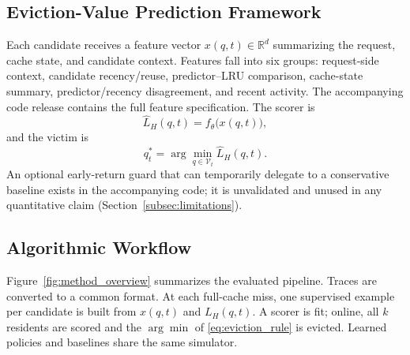 \documentclass[preprint,12pt]{elsarticle}
\begin{document}
\subsection{Eviction-Value Prediction Framework}
\label{subsec:eviction_value_framework}

Each candidate receives a feature vector $x(q,t)\in\mathbb{R}^{d}$ summarizing the request, cache state, and candidate context. Features fall into six groups: request-side context, candidate recency/reuse, predictor--LRU comparison, cache-state summary, predictor/recency disagreement, and recent activity. The accompanying code release contains the full feature specification. The scorer is
\begin{equation}
\widehat{L}_H(q,t)=f_{\theta}\!\bigl(x(q,t)\bigr),
\label{eq:predicted_loss}
\end{equation}
and the victim is
\begin{equation}
q_t^{*}=\arg\min_{q\in\mathcal{V}_t}\widehat{L}_H(q,t).
\label{eq:eviction_rule}
\end{equation}
An optional early-return guard that can temporarily delegate to a conservative baseline exists in the accompanying code; it is unvalidated and unused in any quantitative claim (Section~\ref{subsec:limitations}).

\subsection{Algorithmic Workflow}
\label{subsec:workflow_implementation}

Figure~\ref{fig:method_overview} summarizes the evaluated pipeline. Traces are converted to a common format. At each full-cache miss, one supervised example per candidate is built from $x(q,t)$ and $L_H(q,t)$. A scorer is fit; online, all $k$ residents are scored and the $\arg\min$ of \eqref{eq:eviction_rule} is evicted. Learned policies and baselines share the same simulator.
\end{document}
